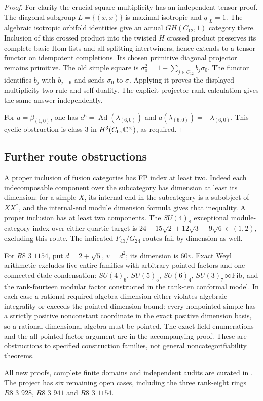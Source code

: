 \begin{proof}
For clarity the crucial square multiplicity has an independent tensor
proof. The diagonal subgroup $L=\{(x,x)\}$ is maximal isotropic and
$q|_L=1$. The algebraic isotropic orbifold identities give an actual
$GH(C_{12},1)$ category there. Inclusion of this crossed product into
the twisted $H$ crossed product preserves its complete basic Hom
lists and all splitting intertwiners, hence extends to a tensor functor
on idempotent completions. Its chosen primitive diagonal projector
remains primitive. The old simple square is
$\sigma_0^2=1+\sum_{j\in C_{12}}b_j\sigma_0$.
The functor identifies $b_j$ with $b_{j+6}$ and sends $\sigma_0$ to
$\sigma$. Applying it proves the displayed multiplicity-two rule and
self-duality. The explicit projector-rank calculation gives the same
answer independently.

For $a=\beta_{(1,0)}$, one has
$a^6=\operatorname{Ad}(\lambda_{(6,0)})$ and
$a(\lambda_{(6,0)})=-\lambda_{(6,0)}$. This cyclic obstruction is
class $3$ in $H^3(C_6,\mathbb C^\times)$, as required.
\end{proof}

\subsection{Further route obstructions}
A proper inclusion of fusion categories has FP index at least two.
Indeed each indecomposable component over the subcategory has dimension
at least its dimension: for a simple $X$, its internal end in the
subcategory is a subobject of $XX^*$, and the internal-end module
dimension formula gives that inequality. A proper inclusion has at
least two components. The $SU(4)_8$ exceptional module-category index
over either quartic target is
$24-15\sqrt2+12\sqrt3-9\sqrt6\in(1,2)$, excluding this route.
The indicated $F_4{}_3/G_2{}_4$ routes fail by dimension as well.

For $R8\_3\_1154$, put $d=2+\sqrt5$, $v=d^2$; its dimension is $60v$.
Exact Weyl arithmetic excludes five entire families with arbitrary
pointed factors and one connected étale condensation:
$SU(4)_6$, $SU(5)_5$, $SU(6)_4$,
$SU(3)_7\boxtimes\mathrm{Fib}$, and the rank-fourteen modular factor
constructed in the rank-ten conformal model. In each case a rational
required algebra dimension either violates algebraic integrality or
exceeds the pointed dimension bound: every nonpointed simple has a
strictly positive nonconstant coordinate in the exact positive
dimension basis, so a rational-dimensional algebra must be pointed.
The exact field enumerations and the all-pointed-factor argument are
in the accompanying proof. These are obstructions to specified
construction families, not general noncategorifiability theorems.

All new proofs, complete finite domains and independent audits are
curated in .
The project has six remaining open cases, including the three rank-eight rings
$R8\_3\_928$, $R8\_3\_941$ and $R8\_3\_1154$.
